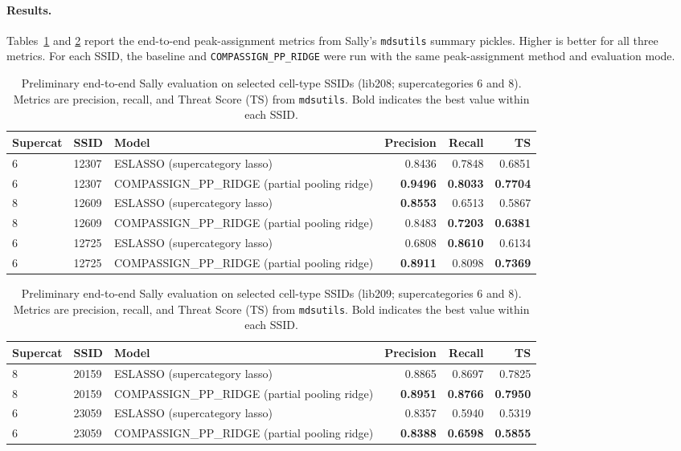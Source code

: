 \documentclass[11pt]{article}
\begin{document}
\paragraph{Results.}
Tables~\ref{tab:sally_prelim_cells_lib208} and \ref{tab:sally_prelim_cells_lib209} report the end-to-end peak-assignment
metrics from Sally's \texttt{mdsutils} summary pickles. Higher is better for all three metrics. For each SSID, the
baseline and \nolinkurl{COMPASSIGN_PP_RIDGE} were run with the same peak-assignment method and evaluation mode.

\begin{table}[H]
\centering
\caption{Preliminary end-to-end Sally evaluation on selected cell-type SSIDs (lib208; supercategories 6 and 8). Metrics
are precision, recall, and Threat Score (TS) from \texttt{mdsutils}. Bold indicates the best value within each SSID.}
\label{tab:sally_prelim_cells_lib208}
\begin{tabular}{lllrrr}
\toprule
Supercat & SSID & Model & Precision & Recall & TS \\
\midrule
6 & 12307 & ESLASSO (supercategory lasso) & 0.8436 & 0.7848 & 0.6851 \\
6 & 12307 & COMPASSIGN\_PP\_RIDGE (partial pooling ridge) & \textbf{0.9496} & \textbf{0.8033} & \textbf{0.7704} \\
\midrule
8 & 12609 & ESLASSO (supercategory lasso) & \textbf{0.8553} & 0.6513 & 0.5867 \\
8 & 12609 & COMPASSIGN\_PP\_RIDGE (partial pooling ridge) & 0.8483 & \textbf{0.7203} & \textbf{0.6381} \\
\midrule
6 & 12725 & ESLASSO (supercategory lasso) & 0.6808 & \textbf{0.8610} & 0.6134 \\
6 & 12725 & COMPASSIGN\_PP\_RIDGE (partial pooling ridge) & \textbf{0.8911} & 0.8098 & \textbf{0.7369} \\
\bottomrule
\end{tabular}
\end{table}

\begin{table}[H]
\centering
\caption{Preliminary end-to-end Sally evaluation on selected cell-type SSIDs (lib209; supercategories 6 and 8). Metrics
are precision, recall, and Threat Score (TS) from \texttt{mdsutils}. Bold indicates the best value within each SSID.}
\label{tab:sally_prelim_cells_lib209}
\begin{tabular}{lllrrr}
\toprule
Supercat & SSID & Model & Precision & Recall & TS \\
\midrule
8 & 20159 & ESLASSO (supercategory lasso) & 0.8865 & 0.8697 & 0.7825 \\
8 & 20159 & COMPASSIGN\_PP\_RIDGE (partial pooling ridge) & \textbf{0.8951} & \textbf{0.8766} & \textbf{0.7950} \\
\midrule
6 & 23059 & ESLASSO (supercategory lasso) & 0.8357 & 0.5940 & 0.5319 \\
6 & 23059 & COMPASSIGN\_PP\_RIDGE (partial pooling ridge) & \textbf{0.8388} & \textbf{0.6598} & \textbf{0.5855} \\
\bottomrule
\end{tabular}
\end{table}
\end{document}
